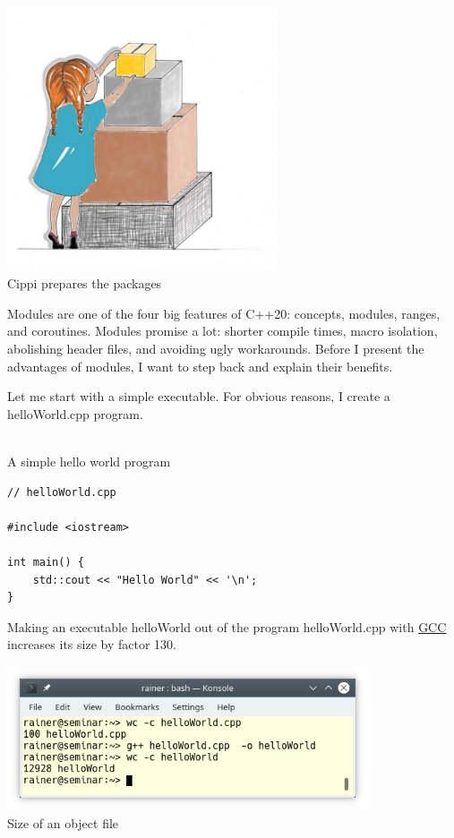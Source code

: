 

\begin{center}
\includegraphics[width=0.6\textwidth]{content/3/chapter4/images/11.png}\\
Cippi prepares the packages
\end{center}

Modules are one of the four big features of C++20: concepts, modules, ranges, and coroutines. Modules promise a lot: shorter compile times, macro isolation, abolishing header files, and avoiding ugly workarounds. Before I present the advantages of modules, I want to step back and explain their benefits.


Let me start with a simple executable. For obvious reasons, I create a helloWorld.cpp program.

\hspace*{\fill} \\ %
\noindent
A simple hello world program
\begin{lstlisting}[style=styleCXX]
// helloWorld.cpp

#include <iostream>

int main() {
	std::cout << "Hello World" << '\n';
}
\end{lstlisting}

Making an executable helloWorld out of the program helloWorld.cpp with \href{http://gcc.gnu.org/}{GCC} increases its size by factor 130.

\begin{center}
\includegraphics[width=0.8\textwidth]{content/3/chapter4/images/12.png}\\
Size of an object file
\end{center}

